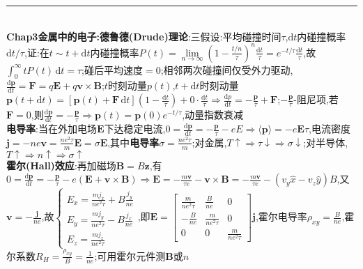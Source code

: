 \documentclass[UTF8,10pt,a4paper]{article}
\begin{document}
\begin{multicols}{2}
\rule{\columnwidth}{.2pt}\\
\textbf{Chap3金属中的电子:德鲁德(Drude)理论}:三假设:平均碰撞时间$\tau$,$\mathrm{d}t$内碰撞概率$\mathrm{d}t/\tau$,证:在$t\sim t+\mathrm{d}t$内碰撞概率$P(t)=\lim\limits_{n\rightarrow\infty}(1-\frac{t/n}{\tau})^n\frac{\mathrm{d}t}{\tau}=e^{-t/\tau}\frac{\mathrm{d}t}{\tau}$,故$\int_0^{\infty}tP(t)\,\mathrm{d}t=\tau$;碰后平均速度$=0$;相邻两次碰撞间仅受外力驱动,$\frac{\mathrm{d}\bm{p}}{\mathrm{d}t}=\bm{F}=q\bm{E}+q\bm{v}\times\bm{B}$;$t$时刻动量$p(t)$,$t+\mathrm{d}t$时刻动量$\bm{p}(t+\mathrm{d}t)=[\bm{p}(t)+\bm{F}\,\mathrm{d}t](1-\frac{\mathrm{d}t}{\tau})+0\cdot\frac{\mathrm{d}t}{\tau}\Rightarrow\frac{\mathrm{d}p}{\mathrm{d}t}=-\frac{\bm{p}}{\tau}+\bm{F}$;$-\frac{\bm{p}}{\tau}$-阻尼项,若$\bm{F}=0$,则$\frac{\mathrm{d}\bm{p}}{\mathrm{d}t}=-\frac{\bm{p}}{\tau}\Rightarrow\bm{p}(t)=\bm{p}(0)e^{-t/\tau}$,动量指数衰减\\
\textbf{电导率}:当在外加电场$\bm{E}$下达稳定电流,$0=\frac{\mathrm{d}\bm{p}}{\mathrm{d}t}=-\frac{\bm{p}}{\tau}-eE\Rightarrow\langle\bm{p}\rangle=-e\bm{E}\tau$,电流密度$\bm{j}=-ne\bm{v}=\frac{ne^2\tau}{m}\bm{E}=\sigma\bm{E}$,其中\textbf{电导率}$\sigma=\frac{ne^2\tau}{m}$;对金属,$T\uparrow\Rightarrow\tau\downarrow\Rightarrow\sigma\downarrow$;对半导体,$T\uparrow\Rightarrow n\uparrow\Rightarrow\sigma\uparrow$\\
\textbf{霍尔(Hall)效应}:再加磁场$\bm{B}=B\bm{z}$,有$0=\frac{\mathrm{d}\bm{p}}{\mathrm{d}t}=-\frac{\bm{p}}{\tau}-e(\bm{E}+\bm{v}\times\bm{B})\Rightarrow\bm{E}=-\frac{m\bm{v}}{\tau e}-\bm{v}\times\bm{B}=-\frac{m\bm{v}}{\tau e}-(v_y\hat{x}-v_z\hat{y})B$,又$\bm{v}=-\frac{\bm{j}}{ne}$,故$\left\{\begin{smallmatrix}
    E_x=\frac{mj_x}{ne^2\tau}+B\frac{j_y}{ne}\\
    E_y=\frac{mj_y}{ne^2\tau}-B\frac{j_x}{ne}\\
    E_z=\frac{mj_z}{ne^2\tau}
\end{smallmatrix}\right.$,即$\bm{E}=\left[\begin{smallmatrix}
    \frac{m}{ne^2\tau}&\frac{B}{ne}&0\\
    -\frac{B}{ne}&\frac{m}{ne^2\tau}&0\\
    0&0&\frac{m}{ne^2\tau}
\end{smallmatrix}\right]\bm{j}$,霍尔电导率$\rho_{xy}=\frac{B}{ne}$,霍尔系数$R_H=\frac{\rho_{xy}}{B}=\frac{1}{ne}$;可用霍尔元件测$\bm{B}$或$n$\\

\end{multicols}
\end{document}

